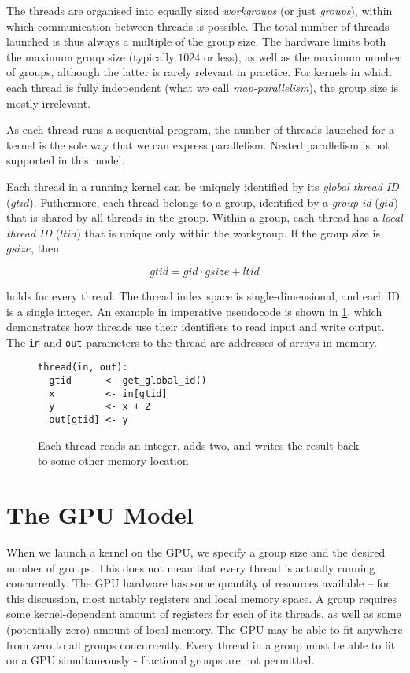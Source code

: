 The threads are organised into equally sized \textit{workgroups} (or
just \textit{groups}), within which communication between threads is
possible.  The total number of threads launched is thus always a
multiple of the group size.  The hardware limits both the maximum
group size (typically $1024$ or less), as well as the maximum number
of groups, although the latter is rarely relevant in practice.  For
kernels in which each thread is fully independent (what we call
\textit{map-parallelism}), the group size is mostly irrelevant.

As each thread runs a sequential program, the number of threads
launched for a kernel is the sole way that we can express parallelism.
Nested parallelism is not supported in this model.

Each thread in a running kernel can be uniquely identified by its
\textit{global thread ID} ($gtid$).  Futhermore, each thread belongs to
a group, identified by a \textit{group id} ($gid$) that is shared by
all threads in the group.  Within a group, each thread has a \textit{local thread ID} ($ltid$) that is unique only within the workgroup.  If the group size is $gsize$, then

\[
gtid = gid \cdot gsize + ltid
\]

holds for every thread.  The thread index space is single-dimensional,
and each ID is a single integer.  An example in imperative pseudocode
is shown in \cref{fig:gpu-map}, which demonstrates how threads use
their identifiers to read input and write output.  The \texttt{in} and
\texttt{out} parameters to the thread are addresses of arrays in
memory.

\begin{figure}
  \centering
\begin{lstlisting}[language={}]
thread(in, out):
  gtid      <- get_global_id()
  x         <- in[gtid]
  y         <- x + 2
  out[gtid] <- y
\end{lstlisting}
  \caption{Each thread reads an integer, adds two, and writes the
    result back to some other memory location}
  \label{fig:gpu-map}
\end{figure}

\section{The GPU Model}

When we launch a kernel on the GPU, we specify a group size and the
desired number of groups.  This does not mean that every thread is
actually running concurrently.  The GPU hardware has some quantity of
resources available -- for this discussion, most notably registers and
local memory space.  A group requires some kernel-dependent amount of
registers for each of its threads, as well as some (potentially zero)
amount of local memory.  The GPU may be able to fit anywhere from zero
to all groups concurrently.  Every thread in a group must be able to
fit on a GPU simultaneously - fractional groups are not permitted.

